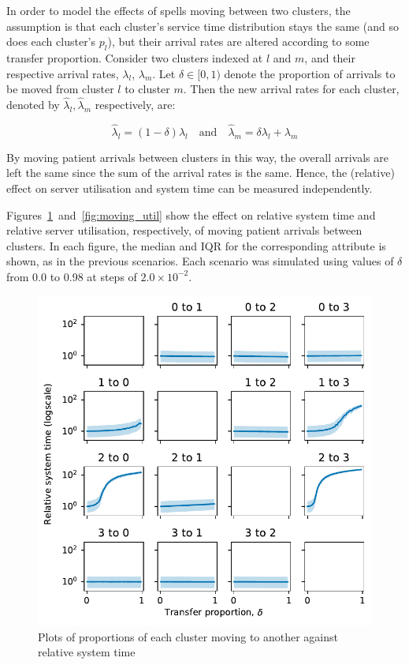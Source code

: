 In order to model the effects of spells moving between two clusters, the
assumption is that each cluster's service time distribution stays the same (and
so does each cluster's \(p_l\)), but their arrival rates are altered according
to some transfer proportion. Consider two clusters indexed at \(l\) and \(m\),
and their respective arrival rates, \(\lambda_l\), \(\lambda_m\). Let \(\delta
\in [0, 1)\) denote the proportion of arrivals to be moved from cluster \(l\) to
cluster \(m\). Then the new arrival rates for each cluster, denoted by
\(\hat\lambda_l, \hat\lambda_m\) respectively, are:

\begin{equation}\label{eq:moving}
    \hat\lambda_l = \left(1 - \delta\right) \lambda_l
    \quad \text{and} \quad
    \hat\lambda_m = \delta\lambda_l + \lambda_m
\end{equation}

By moving patient arrivals between clusters in this way, the overall arrivals
are left the same since the sum of the arrival rates is the same. Hence, the
(relative) effect on server utilisation and system time can be measured
independently.

Figures~\ref{fig:moving_time}~and~\ref{fig:moving_util} show the effect on
relative system time and relative server utilisation, respectively, of moving
patient arrivals between clusters. In each figure, the median and IQR for the
corresponding attribute is shown, as in the previous scenarios. Each scenario
was simulated using values of \(\delta\) from 0.0 to 0.98 at steps of \(2.0
\times 10^{-2}\).

\begin{figure}
    \centering
    \includegraphics[width=\textwidth]{moving_time}
    \caption{%
        Plots of proportions of each cluster moving to another against relative
        system time
    }\label{fig:moving_time}
\end{figure}

